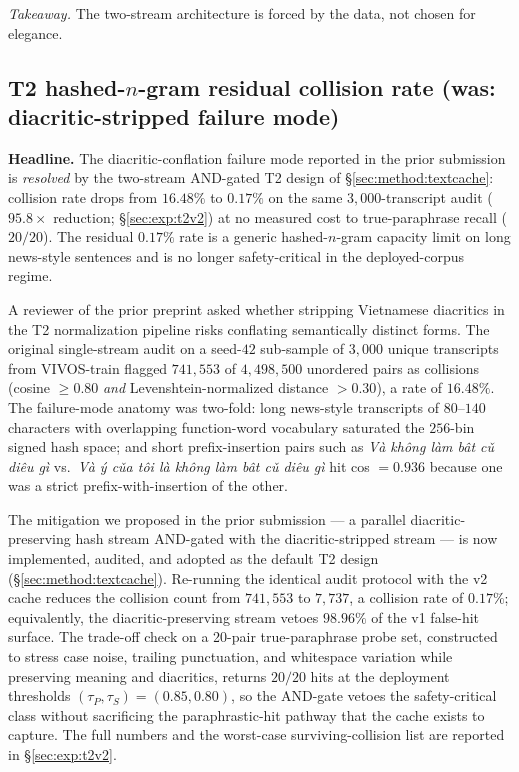 \documentclass[a4paper,fleqn]{cas-dc}
\begin{document}
\noindent\textit{Takeaway.} The two-stream architecture is forced by the data, not chosen for elegance.

\subsection{T2 hashed-$n$-gram residual collision rate (was: diacritic-stripped failure mode)}\label{sec:lim:t2collide}
\textbf{Headline.} The diacritic-conflation failure mode reported in the prior submission is \emph{resolved} by the two-stream AND-gated T2 design of \S\ref{sec:method:textcache}: collision rate drops from $16.48\%$ to $\mathbf{0.17\%}$ on the same $3{,}000$-transcript audit ($95.8\times$ reduction; \S\ref{sec:exp:t2v2}) at no measured cost to true-paraphrase recall ($20/20$). The residual $0.17\%$ rate is a generic hashed-$n$-gram capacity limit on long news-style sentences and is no longer safety-critical in the deployed-corpus regime.

A reviewer of the prior preprint asked whether stripping Vietnamese diacritics in the T2 normalization pipeline risks conflating semantically distinct forms. The original single-stream audit on a seed-$42$ sub-sample of $3{,}000$ unique transcripts from VIVOS-train flagged $741{,}553$ of $4{,}498{,}500$ unordered pairs as collisions (cosine $\geq 0.80$ \emph{and} Levenshtein-normalized distance $> 0.30$), a rate of $16.48\%$. The failure-mode anatomy was two-fold: long news-style transcripts of $80$--$140$ characters with overlapping function-word vocabulary saturated the $256$-bin signed hash space; and short prefix-insertion pairs such as \emph{V\`a kh\^ong l\`am b\^at c\v{u} di\^eu g\`i} vs.\ \emph{V\`a \'y c\v{u}a t\^oi l\`a kh\^ong l\`am b\^at c\v{u} di\^eu g\`i} hit cos $= 0.936$ because one was a strict prefix-with-insertion of the other.

The mitigation we proposed in the prior submission --- a parallel diacritic-preserving hash stream AND-gated with the diacritic-stripped stream --- is now implemented, audited, and adopted as the default T2 design (\S\ref{sec:method:textcache}). Re-running the identical audit protocol with the v2 cache reduces the collision count from $741{,}553$ to $7{,}737$, a collision rate of $0.17\%$; equivalently, the diacritic-preserving stream vetoes $98.96\%$ of the v1 false-hit surface. The trade-off check on a 20-pair true-paraphrase probe set, constructed to stress case noise, trailing punctuation, and whitespace variation while preserving meaning and diacritics, returns $20/20$ hits at the deployment thresholds $(\tau_{P}, \tau_{S}) = (0.85, 0.80)$, so the AND-gate vetoes the safety-critical class without sacrificing the paraphrastic-hit pathway that the cache exists to capture. The full numbers and the worst-case surviving-collision list are reported in \S\ref{sec:exp:t2v2}.
\end{document}
